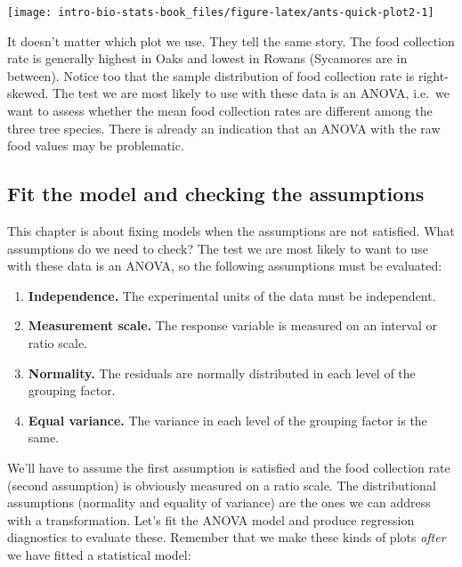 \documentclass[
]{book}
\providecommand{\tightlist}{%
  \setlength{\itemsep}{0pt}\setlength{\parskip}{0pt}}
\begin{document}
\begin{center}\texttt{[image: intro-bio-stats-book\_files/figure-latex/ants-quick-plot2-1]} \end{center}

It doesn't matter which plot we use. They tell the same story. The food collection rate is generally highest in Oaks and lowest in Rowans (Sycamores are in between). Notice too that the sample distribution of food collection rate is right-skewed. The test we are most likely to use with these data is an ANOVA, i.e.~we want to assess whether the mean food collection rates are different among the three tree species. There is already an indication that an ANOVA with the raw food values may be problematic.

\hypertarget{fit-the-model-and-checking-the-assumptions}{%
\subsection{Fit the model and checking the assumptions}\label{fit-the-model-and-checking-the-assumptions}}

This chapter is about fixing models when the assumptions are not satisfied. What assumptions do we need to check? The test we are most likely to want to use with these data is an ANOVA, so the following assumptions must be evaluated:

\begin{enumerate}
\def\labelenumi{\arabic{enumi}.}
\tightlist
\item
  \textbf{Independence.} The experimental units of the data must be independent.
\item
  \textbf{Measurement scale.} The response variable is measured on an interval or ratio scale.
\item
  \textbf{Normality.} The residuals are normally distributed in each level of the grouping factor.
\item
  \textbf{Equal variance.} The variance in each level of the grouping factor is the same.
\end{enumerate}

We'll have to assume the first assumption is satisfied and the food collection rate (second assumption) is obviously measured on a ratio scale. The distributional assumptions (normality and equality of variance) are the ones we can address with a transformation. Let's fit the ANOVA model and produce regression diagnostics to evaluate these. Remember that we make these kinds of plots \emph{after} we have fitted a statistical model:
\end{document}
